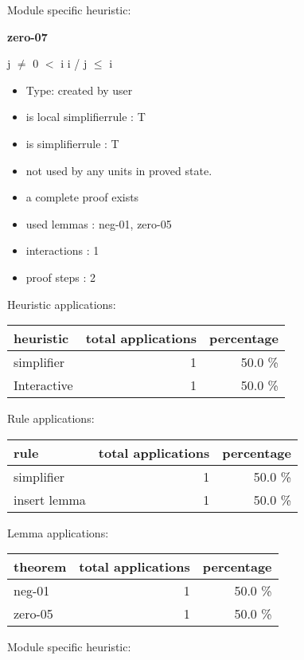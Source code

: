 \documentclass[a4paper]{article}
\begin{document}
Module specific heuristic:

\pagebreak

{\LARGE\bf zero-07}\label{lemma-zero-07}

\medskip

j $\neq$ 0  $<$ i \Imp i / j $\le$ i

\begin{itemize}

\item Type: created by user

\item is local simplifierrule : T
\item is simplifierrule : T
\item not used by any units in proved state.
\item       a complete proof exists
\item       used lemmas  : neg-01, zero-05
\item       interactions : 1
\item       proof steps  : 2
\end{itemize}

\medskip


Heuristic applications:

\begin{supertabular}{l|r|r}
heuristic	& total applications & percentage \\ \hline
simplifier & 1 & 50.0 \% \\
Interactive & 1 & 50.0 \% \\

\end{supertabular}

Rule applications:

\begin{supertabular}{l|r|r}
rule	        & total applications & percentage \\ \hline
simplifier & 1 & 50.0 \% \\
insert lemma & 1 & 50.0 \% \\

\end{supertabular}

Lemma applications:

\begin{supertabular}{l|r|r}
theorem	        & total applications & percentage \\ \hline
neg-01 & 1 & 50.0 \% \\
zero-05 & 1 & 50.0 \% \\

\end{supertabular}

Module specific heuristic:
\end{document}

